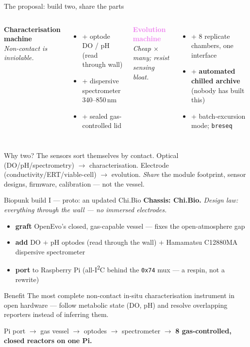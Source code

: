 \documentclass[aspectratio=169,11pt]{beamer}
\newcommand{\ac}[1]{\textcolor{accent}{\textbf{#1}}}
\begin{document}
\begin{frame}{The proposal: build two, share the parts}
  \begin{columns}[T]
      \textbf{\textcolor{accent}{Characterisation machine}} \\
      \emph{Non-contact is inviolable.}
      \begin{itemize}\small
        \item + optode DO / pH (read through wall)
        \item + dispersive spectrometer 340--850\,nm
        \item + sealed gas-controlled lid
      \end{itemize}
      \textbf{\textcolor{violet}{Evolution machine}} \\
      \emph{Cheap $\times$ many; resist sensing bloat.}
      \begin{itemize}\small
        \item + 8 replicate chambers, one interface
        \item + \textbf{automated chilled archive} (nobody has built this)
        \item + batch-excursion mode; \texttt{breseq}
      \end{itemize}
  \end{columns}
  \vspace{0.7em}
  \begin{block}{Why two? The sensors sort themselves by contact.}
  Optical (DO/pH/spectrometry) $\to$ characterisation. Electrode (conductivity/ERT/viable-cell) $\to$ evolution.
  \emph{Share} the module footprint, sensor designs, firmware, calibration --- not the vessel.
  \end{block}
\end{frame}

\begin{frame}{Biopunk build I --- \textcolor{accent}{proto}: an updated Chi.Bio}
  \textbf{Chassis: Chi.Bio.} \emph{Design law: everything through the wall --- no immersed electrodes.}
  \begin{itemize}\small
    \item \textbf{graft} OpenEvo's closed, gas-capable vessel --- fixes the open-atmosphere gap
    \item \textbf{add} DO $+$ pH optodes (read through the wall) $+$ Hamamatsu C12880MA dispersive spectrometer
    \item \textbf{port} to Raspberry Pi (all-I\textsuperscript{2}C behind the \texttt{0x74} mux --- a respin, not a rewrite)
  \end{itemize}
  \begin{block}{Benefit}
  \small The most complete non-contact in-situ characterisation instrument in open hardware --- follow metabolic state (DO, pH) and resolve overlapping reporters instead of inferring them.
  \end{block}
  \begin{center}\small
  Pi port $\to$ gas vessel $\to$ optodes $\to$ spectrometer $\to$
  \ac{8 gas-controlled, closed reactors on one Pi.}
  \end{center}
\end{frame}
\end{document}
